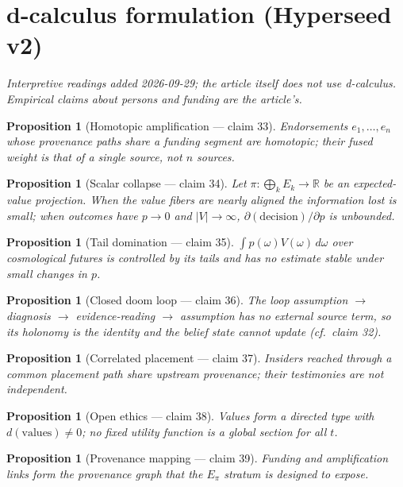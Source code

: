 \documentclass[11pt,a4paper]{article}
\newtheorem{proposition}[definition]{Proposition}
\begin{document}
\section{d-calculus formulation (Hyperseed v2)}
\emph{Interpretive readings added 2026-09-29; the article itself does not use
d-calculus. Empirical claims about persons and funding are the article's.}

\begin{proposition}[Homotopic amplification --- claim 33]
Endorsements $e_1,\dots,e_n$ whose provenance paths share a funding segment
are homotopic; their fused weight is that of a single source, not $n$ sources.
\end{proposition}

\begin{proposition}[Scalar collapse --- claim 34]
Let $\pi:\bigoplus_k E_k\to\mathbb{R}$ be an expected-value projection. When
the value fibers are nearly aligned the information lost is small; when
outcomes have $p\to 0$ and $|V|\to\infty$, $\partial(\mathrm{decision})/\partial p$
is unbounded.
\end{proposition}

\begin{proposition}[Tail domination --- claim 35]
$\int p(\omega)V(\omega)\,d\omega$ over cosmological futures is controlled by
its tails and has no estimate stable under small changes in $p$.
\end{proposition}

\begin{proposition}[Closed doom loop --- claim 36]
The loop assumption $\to$ diagnosis $\to$ evidence-reading $\to$ assumption has
no external source term, so its holonomy is the identity and the belief state
cannot update (cf.\ claim 32).
\end{proposition}

\begin{proposition}[Correlated placement --- claim 37]
Insiders reached through a common placement path share upstream provenance;
their testimonies are not independent.
\end{proposition}

\begin{proposition}[Open ethics --- claim 38]
Values form a directed type with $d(\mathrm{values})\neq 0$; no fixed utility
function is a global section for all $t$.
\end{proposition}

\begin{proposition}[Provenance mapping --- claim 39]
Funding and amplification links form the provenance graph that the
$E_\pi$ stratum is designed to expose.
\end{proposition}
\end{document}
